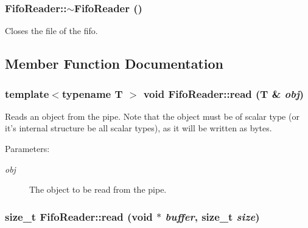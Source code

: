 \hypertarget{classFifoReader_38ab41237521a8dcdb6ce8ef41ed0537}{
\subsubsection[{$\sim$FifoReader}]{\setlength{\rightskip}{0pt plus 5cm}FifoReader::$\sim$FifoReader ()}}
\label{classFifoReader_38ab41237521a8dcdb6ce8ef41ed0537}


Closes the file of the fifo. 

\subsection{Member Function Documentation}
\hypertarget{classFifoReader_21acedc956fdb98f23a2ba069cae3fe1}{
\subsubsection[{read}]{\setlength{\rightskip}{0pt plus 5cm}template$<$typename T $>$ void FifoReader::read (T \& {\em obj})}}
\label{classFifoReader_21acedc956fdb98f23a2ba069cae3fe1}


Reads an object from the pipe. Note that the object must be of scalar type (or it's internal structure be all scalar types), as it will be written as bytes.

\begin{Desc}
\item[Parameters:]
\begin{description}
\item[{\em obj}]The object to be read from the pipe. \end{description}
\end{Desc}
\hypertarget{classFifoReader_cff266ab8fb625353fb8cdf866d91674}{
\subsubsection[{read}]{\setlength{\rightskip}{0pt plus 5cm}size\_\-t FifoReader::read (void $\ast$ {\em buffer}, \/  size\_\-t {\em size})}}
\label{classFifoReader_cff266ab8fb625353fb8cdf866d91674}


